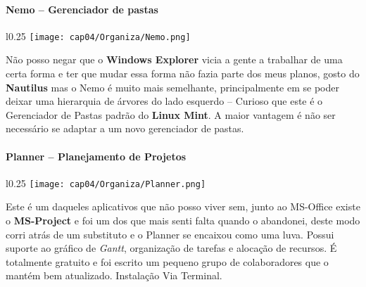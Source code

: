 \paragraph{Nemo – Gerenciador de pastas}
\begin{minipage}{\linewidth}
 \vspace{5pt}
 \begin{wrapfigure}{l}{0.25\textwidth}
  \vspace{-\baselineskip}
  \texttt{[image: cap04/Organiza/Nemo.png]} 
 \end{wrapfigure}
 Não posso negar que o \textbf{Windows Explorer} vicia a gente a trabalhar de uma certa forma e ter que mudar essa forma não fazia parte dos meus planos, gosto do \textbf{Nautilus} mas o Nemo é muito mais semelhante, principalmente em se poder deixar uma hierarquia de árvores do lado esquerdo – Curioso que este é o Gerenciador de Pastas padrão do \textbf{Linux Mint}. A maior vantagem é não ser necessário se adaptar a um novo gerenciador de pastas.
\end{minipage}

\paragraph{Planner – Planejamento de Projetos}
\begin{minipage}{\linewidth}
 \vspace{5pt}
 \begin{wrapfigure}{l}{0.25\textwidth}
  \vspace{-\baselineskip}
  \texttt{[image: cap04/Organiza/Planner.png]} 
 \end{wrapfigure}
 Este é um daqueles aplicativos que não posso viver sem, junto ao MS-Office existe o \textbf{MS-Project} e foi um dos que mais senti falta quando o abandonei, deste modo corri atrás de um substituto e o Planner se encaixou como uma luva. Possui suporte ao gráfico de \textit{Gantt}, organização de tarefas e alocação de recursos. É totalmente gratuito e foi escrito um pequeno grupo de colaboradores que o mantém bem atualizado. Instalação Via Terminal.
\end{minipage}

